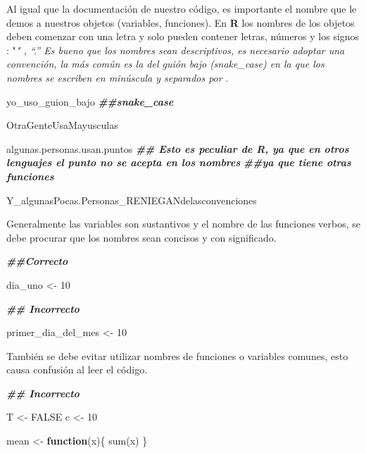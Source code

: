 \documentclass[
  12pt,
]{book}
\newenvironment{Shaded}{\begin{snugshade}}{\end{snugshade}}
\newcommand{\ConstantTok}[1]{\textcolor[rgb]{0.00,0.00,0.00}{#1}}
\newcommand{\ControlFlowTok}[1]{\textcolor[rgb]{0.13,0.29,0.53}{\textbf{#1}}}
\newcommand{\DecValTok}[1]{\textcolor[rgb]{0.00,0.00,0.81}{#1}}
\newcommand{\DocumentationTok}[1]{\textcolor[rgb]{0.56,0.35,0.01}{\textbf{\textit{#1}}}}
\newcommand{\FunctionTok}[1]{\textcolor[rgb]{0.00,0.00,0.00}{#1}}
\newcommand{\NormalTok}[1]{#1}
\newcommand{\OtherTok}[1]{\textcolor[rgb]{0.56,0.35,0.01}{#1}}
\begin{document}
Al igual que la documentación de nuestro código, es importante el nombre que le demos a nuestros objetos (variables, funciones). En \textbf{R} los nombres de los objetos deben comenzar con una letra y solo pueden contener letras, números y los signos : "\emph{" , ``.'' Es bueno que los nombres sean descriptivos, es necesario adoptar una convención, la más común es la del guión bajo (snake\_case) en la que los nombres se escriben en minúscula y separados por } .

\begin{Shaded}
\begin{Highlighting}[]
\NormalTok{yo\_uso\_guion\_bajo  }\DocumentationTok{\#\#snake\_case}

\NormalTok{OtraGenteUsaMayusculas }

\NormalTok{algunas.personas.usan.puntos }\DocumentationTok{\#\# Esto es peculiar de R, ya que en otros lenguajes el punto no se acepta en los nombres}
                             \DocumentationTok{\#\#ya que tiene otras funciones}

\NormalTok{Y\_algunasPocas.Personas\_RENIEGANdelasconvenciones}
\end{Highlighting}
\end{Shaded}

Generalmente las variables son sustantivos y el nombre de las funciones verbos, se debe procurar que los nombres sean concisos y con significado.

\begin{Shaded}
\begin{Highlighting}[]
\DocumentationTok{\#\#Correcto}

\NormalTok{dia\_uno }\OtherTok{\textless{}{-}} \DecValTok{10}

\DocumentationTok{\#\# Incorrecto}

\NormalTok{primer\_dia\_del\_mes }\OtherTok{\textless{}{-}} \DecValTok{10}
\end{Highlighting}
\end{Shaded}

También se debe evitar utilizar nombres de funciones o variables comunes, esto causa confusión al leer el código.

\begin{Shaded}
\begin{Highlighting}[]
\DocumentationTok{\#\# Incorrecto}

\NormalTok{T }\OtherTok{\textless{}{-}} \ConstantTok{FALSE}
\NormalTok{c }\OtherTok{\textless{}{-}} \DecValTok{10}

\NormalTok{mean }\OtherTok{\textless{}{-}} \ControlFlowTok{function}\NormalTok{(x)\{}
  \FunctionTok{sum}\NormalTok{(x)}
\NormalTok{\} }
\end{Highlighting}
\end{Shaded}
\end{document}
